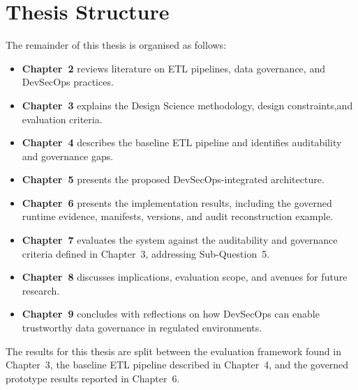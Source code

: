 \section{Thesis Structure}
\noindent
The remainder of this thesis is organised as follows:
\begin{itemize}
  \item \textbf{Chapter~2} reviews literature on ETL pipelines, data governance,
  and DevSecOps practices.
  \item \textbf{Chapter~3} explains the Design Science methodology,
  design constraints,and evaluation criteria.
  \item \textbf{Chapter~4} describes the baseline ETL pipeline and identifies
  auditability and governance gaps.
  \item \textbf{Chapter~5} presents the proposed DevSecOps-integrated
  architecture.
  \item \textbf{Chapter~6} presents the implementation results, including the
  governed runtime evidence, manifests, versions, and audit reconstruction
  example.
  \item \textbf{Chapter~7} evaluates the system against the auditability and
  governance criteria defined in Chapter~3, addressing Sub-Question~5.
  \item \textbf{Chapter~8} discusses implications, evaluation scope, and avenues
  for future research.
  \item \textbf{Chapter~9} concludes with reflections on how DevSecOps can
  enable trustworthy data governance in regulated environments.
\end{itemize}

The results for this thesis are split between the evaluation framework found in
Chapter~3, the baseline ETL pipeline described in Chapter~4, and the governed
prototype results reported in Chapter~6.
